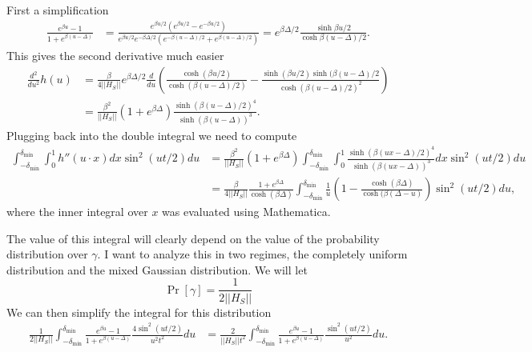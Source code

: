 \documentclass[
 amsmath,amssymb,
 aps,
onecolumn, 
nofootinbib]{revtex4-2}
\newcommand{\norm}[1]{\left|\left| #1 \right|\right|}
\begin{document}
First a simplification
\begin{align}
    \frac{e^{\beta u} - 1}{1 + e^{\beta (u- \Delta)}} &=  \frac{e^{\beta u/2} (e^{\beta u /2} - e^{-\beta u / 2})}{e^{\beta u /2} e^{-\beta \Delta / 2} (e^{-\beta (u - \Delta) / 2} + e^{\beta (u - \Delta)/2})} = e^{\beta \Delta / 2} \frac{\sinh{\beta u /2}}{\cosh \beta (u-\Delta)/2}.
\end{align}
This gives the second derivative much easier
\begin{align}
    \frac{d^2}{du^2} h(u) &= \frac{\beta}{4 \norm{H_S}} e^{\beta \Delta /2} \frac{d}{du} \left( \frac{\cosh(\beta u /2)}{\cosh(\beta (u - \Delta) / 2)} - \frac{\sinh(\beta u / 2) \sinh(\beta (u - \Delta) / 2}{\cosh(\beta (u - \Delta)/2)^2} \right) \nonumber \\
    &= \frac{\beta^2}{ \norm{H_S}} \left(1 + e^{\beta \Delta}\right)  \frac{\sinh(\beta(u - \Delta)/2)^4}{\sinh(\beta ( u -\Delta))^3}.
\end{align}
Plugging back into the double integral we need to compute
\begin{align}
    \int_{-\delta_{\min}}^{\delta_{\min}} \int_{0}^1 h''(u \cdot x) dx \sin^2(u t /2) du &= \frac{\beta^2}{\norm{H_S}} \left( 1 + e^{\beta \Delta}\right) \int_{-\delta_{\min}}^{\delta_{\min}} \int_0^1 \frac{\sinh(\beta(u x - \Delta)/2)^4}{\sinh(\beta ( u x -\Delta))^3} dx \sin^2(u t /2) du \\
    &= \frac{\beta}{4 \norm{H_S}} \frac{1 + e^{\beta \Delta}}{\cosh(\beta \Delta)} \int_{-\delta_{\min}}^{\delta_{\min}} \frac{1}{u} \left(1 - \frac{\cosh(\beta \Delta)}{\cosh(\beta(\Delta - u)}\right) \sin^2 (u t /2) du,
\end{align}
where the inner integral over $x$ was evaluated using Mathematica. 

The value of this integral will clearly depend on the value of the probability distribution over $\gamma$. I want to analyze this in two regimes, the completely uniform distribution and the mixed Gaussian distribution. We will let
\begin{equation}
    \Pr[\gamma] = \frac{1}{2 \norm{H_S}}
\end{equation}
We can then simplify the integral for this distribution
\begin{align}
    \frac{1}{2\norm{H_S}} \int_{-\delta_{\min}}^{\delta_{\min}} \frac{e^{\beta u} - 1}{1 + e^{\beta(u - \Delta)}} \frac{4 \sin^2(u t /2)}{u^2 t^2} du &= \frac{2}{ \norm{H_S} t^2 } \int_{-\delta_{\min}}^{\delta_{\min}} \frac{e^{\beta u} - 1}{ 1 + e^{\beta (u - \Delta)}} \frac{\sin^2(u t /2)}{u^2} du.
\end{align}
\end{document}
